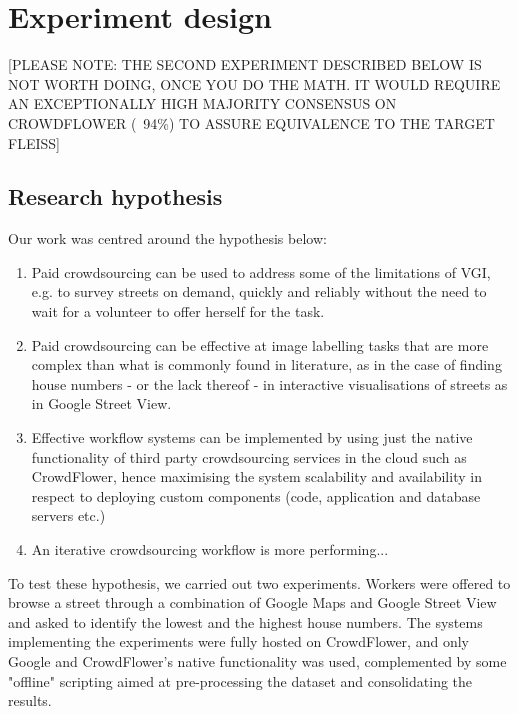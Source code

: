 \section{Experiment design}

[PLEASE NOTE: THE SECOND EXPERIMENT DESCRIBED BELOW IS NOT WORTH DOING, ONCE YOU DO THE MATH. IT WOULD REQUIRE AN EXCEPTIONALLY HIGH MAJORITY CONSENSUS ON CROWDFLOWER (~94\%) TO ASSURE EQUIVALENCE TO THE TARGET FLEISS] 

\subsection{Research hypothesis}

Our work was centred around the hypothesis below:

\begin{enumerate}

    \item Paid crowdsourcing can be used to address some of the limitations of VGI, e.g. to survey streets on demand, quickly and reliably without the need to wait for a volunteer to offer herself for the task.
    
    \item Paid crowdsourcing can be effective at image labelling tasks that are more complex than what is commonly found in literature, as in the case of finding house numbers - or the lack thereof - in interactive visualisations of streets as in Google Street View.

    \item Effective workflow systems can be implemented by using just the native functionality of third party crowdsourcing services in the cloud such as CrowdFlower, hence maximising the system scalability and availability in respect to deploying custom components (code, application and database servers etc.)

    \item An iterative crowdsourcing workflow is more performing...
    
\end{enumerate}

To test these hypothesis, we carried out two experiments. Workers were offered to browse a street through a combination of Google Maps and Google Street View and asked to identify the lowest and the highest house numbers. The systems implementing the experiments were fully hosted on CrowdFlower, and only Google and CrowdFlower's native functionality was used, complemented by some "offline" scripting aimed at pre-processing the dataset and consolidating the results.


